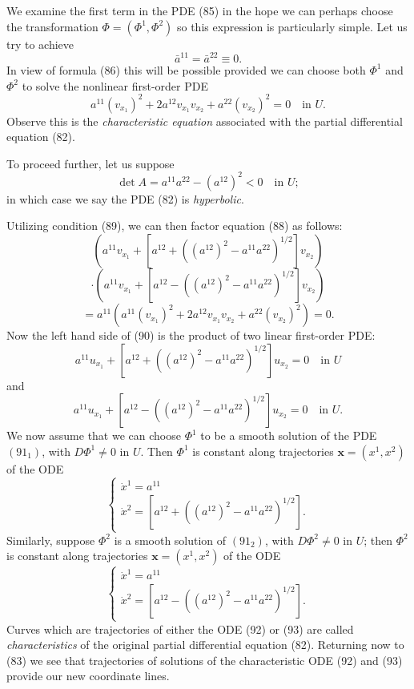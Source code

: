 We examine the first term in the PDE (85) in the hope we can perhaps choose the transformation $\Phi = (\Phi^1, \Phi^2)$ so this expression is particularly simple. Let us try to achieve
\[
\bar{a}^{11} = \bar{a}^{22} \equiv 0.
\tag{87}
\]
In view of formula (86) this will be possible provided we can choose both $\Phi^1$ and $\Phi^2$ to solve the nonlinear first-order PDE
\[
a^{11}(v_{x_1})^2 + 2a^{12}v_{x_1}v_{x_2} + a^{22}(v_{x_2})^2 = 0 \quad \text{in } U.
\tag{88}
\]
Observe this is the \textit{characteristic equation} associated with the partial differential equation (82).

To proceed further, let us suppose
\[
\det A = a^{11}a^{22} - (a^{12})^2 < 0 \quad \text{in } U;
\tag{89}
\]
in which case we say the PDE (82) is \textit{hyperbolic}.

Utilizing condition (89), we can then factor equation (88) as follows:
\[
\left(a^{11}v_{x_1} + \left[a^{12} + ((a^{12})^2 - a^{11}a^{22})^{1/2}\right]v_{x_2}\right)
\]
\[
\cdot \left(a^{11}v_{x_1} + \left[a^{12} - ((a^{12})^2 - a^{11}a^{22})^{1/2}\right]v_{x_2}\right)
\]
\[
= a^{11}\left(a^{11}(v_{x_1})^2 + 2a^{12}v_{x_1}v_{x_2} + a^{22}(v_{x_2})^2\right) = 0.
\tag{90}
\]
Now the left hand side of (90) is the product of two linear first-order PDE:
\[
a^{11} u_{x_1} + \left[a^{12} + ((a^{12})^2 - a^{11}a^{22})^{1/2}\right] u_{x_2} = 0 \quad \text{in } U
\tag{$91_1$}
\]
and
\[
a^{11} u_{x_1} + \left[a^{12} - ((a^{12})^2 - a^{11}a^{22})^{1/2}\right] u_{x_2} = 0 \quad \text{in } U.
\tag{$91_2$}
\]
We now assume that we can choose $\Phi^1$ to be a smooth solution of the PDE $(91_1)$, with $D\Phi^1 \neq 0$ in $U$. Then $\Phi^1$ is constant along trajectories $\mathbf{x} = (x^1, x^2)$ of the ODE
\[
\begin{cases} \dot{x}^1 = a^{11} \\ \dot{x}^2 = \left[a^{12} + ((a^{12})^2 - a^{11}a^{22})^{1/2}\right]. \end{cases}
\tag{92}
\]
Similarly, suppose $\Phi^2$ is a smooth solution of $(91_2)$, with $D\Phi^2 \neq 0$ in $U$; then $\Phi^2$ is constant along trajectories $\mathbf{x} = (x^1, x^2)$ of the ODE
\[
\begin{cases} \dot{x}^1 = a^{11} \\ \dot{x}^2 = \left[a^{12} - ((a^{12})^2 - a^{11}a^{22})^{1/2}\right]. \end{cases}
\tag{93}
\]
Curves which are trajectories of either the ODE (92) or (93) are called \textit{characteristics} of the original partial differential equation (82). Returning now to (83) we see that trajectories of solutions of the characteristic ODE (92) and (93) provide our new coordinate lines.

